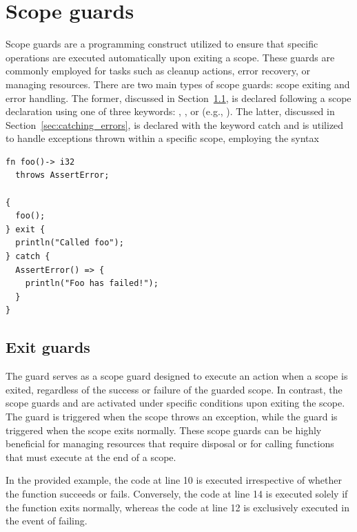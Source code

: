 \section{Scope guards}%
\label{sec:scope_guards}

Scope guards are a programming construct utilized to ensure that specific
operations are executed automatically upon exiting a scope. These guards are
commonly employed for tasks such as cleanup actions, error recovery, or managing
resources. There are two main types of scope guards: scope exiting and error
handling. The former, discussed in Section~\ref{sec:exit_guards}, is declared
following a scope declaration using one of three keywords: ,
, or  (e.g., ). The
latter, discussed in Section~\ref{sec:catching_errors}, is declared with the
keyword catch and is utilized to handle exceptions thrown within a specific
scope, employing the syntax 


\begin{lstlisting}[style=coloredverbatim]
fn foo()-> i32
  throws AssertError;

{
  foo();
} exit {
  println("Called foo");
} catch {
  AssertError() => {
    println("Foo has failed!");
  }
}
\end{lstlisting}

\subsection{Exit guards}
\label{sec:exit_guards}

The  guard serves as a scope guard designed to execute an action
when a scope is exited, regardless of the success or failure of the guarded
scope. In contrast, the scope guards  and  are
activated under specific conditions upon exiting the scope. The guard
 is triggered when the scope throws an exception, while the guard
 is triggered when the scope exits normally. These scope guards
can be highly beneficial for managing resources that require disposal or for
calling functions that must execute at the end of a scope.

\smallskip

In the provided example, the code at line 10 is executed irrespective of whether
the  function succeeds or fails. Conversely, the code at line 14 is
executed solely if the  function exits normally, whereas the code at
line 12 is exclusively executed in the event of  failing.

